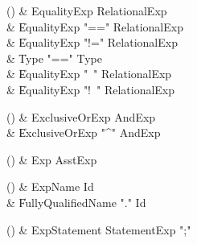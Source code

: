 \begin{bbgrammarappendix}

() & EqualityExp \label{prod:EqualityExp}  \: RelationalExp  \\

 &    \| EqualityExp \xcd"==" RelationalExp \\
 &    \| EqualityExp \xcd"!=" RelationalExp \\
 &    \| Type  \xcd"==" Type  \\
 &    \| EqualityExp \xcd"~" RelationalExp \\
 &    \| EqualityExp \xcd"!~" RelationalExp \\

\end{bbgrammarappendix}

\begin{bbgrammarappendix}

() & ExclusiveOrExp \label{prod:ExclusiveOrExp}  \: AndExp  \\

 &    \| ExclusiveOrExp \xcd"^" AndExp \\

\end{bbgrammarappendix}

\begin{bbgrammarappendix}

() & Exp \label{prod:Exp}  \: AsstExp  \\


\end{bbgrammarappendix}

\begin{bbgrammarappendix}

() & ExpName \label{prod:ExpName}  \: Id  \\

 &    \| FullyQualifiedName \xcd"." Id \\

\end{bbgrammarappendix}

\begin{bbgrammarappendix}

() & ExpStatement \label{prod:ExpStatement}  \: StatementExp \xcd";"  \\


\end{bbgrammarappendix}

